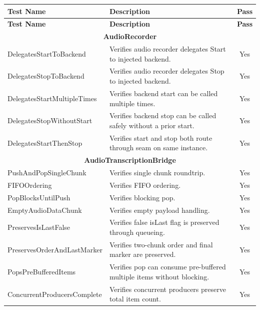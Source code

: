 \begin{longtable}{|p{}|p{}|c|}
\hline
\textbf{Test Name} & \textbf{Description} & \textbf{Pass} \\
\hline
\endfirsthead

\hline
\textbf{Test Name} & \textbf{Description} & \textbf{Pass} \\
\hline
\endhead

\hline
\multicolumn{3}{|c|}{\textbf{AudioRecorder}} \\
\hline
DelegatesStartToBackend & Verifies audio recorder delegates Start to injected backend. & Yes \\ \hline
DelegatesStopToBackend & Verifies audio recorder delegates Stop to injected backend. & Yes \\ \hline
DelegatesStartMultipleTimes & Verifies backend start can be called multiple times. & Yes \\ \hline
DelegatesStopWithoutStart & Verifies backend stop can be called safely without a prior start. & Yes \\ \hline
DelegatesStartThenStop & Verifies start and stop both route through seam on same instance. & Yes \\ \hline

\hline
\multicolumn{3}{|c|}{\textbf{AudioTranscriptionBridge}} \\
\hline
PushAndPopSingleChunk & Verifies single chunk roundtrip. & Yes \\ \hline
FIFOOrdering & Verifies FIFO ordering. & Yes \\ \hline
PopBlocksUntilPush & Verifies blocking pop. & Yes \\ \hline
EmptyAudioDataChunk & Verifies empty payload handling. & Yes \\ \hline
PreservesIsLastFalse & Verifies false isLast flag is preserved through queueing. & Yes \\ \hline
PreservesOrderAndLastMarker & Verifies two-chunk order and final marker are preserved. & Yes \\ \hline
PopsPreBufferedItems & Verifies pop can consume pre-buffered multiple items without blocking. & Yes \\ \hline
ConcurrentProducersComplete & Verifies concurrent producers preserve total item count. & Yes \\ \hline


\end{longtable}
